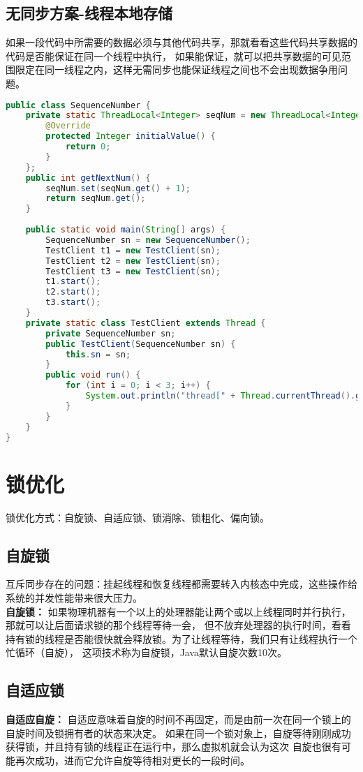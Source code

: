 \subsection{无同步方案-线程本地存储}
如果一段代码中所需要的数据必须与其他代码共享，那就看看这些代码共享数据的代码是否能保证在同一个线程中执行，
如果能保证，就可以把共享数据的可见范围限定在同一线程之内，这样无需同步也能保证线程之间也不会出现数据争用问题。
\begin{lstlisting}[language=java]
public class SequenceNumber {
	private static ThreadLocal<Integer> seqNum = new ThreadLocal<Integer>(){
		@Override
		protected Integer initialValue() {
			return 0;
		}
	};
	public int getNextNum() {
		seqNum.set(seqNum.get() + 1);
		return seqNum.get();
	}
	
	public static void main(String[] args) {
		SequenceNumber sn = new SequenceNumber();
		TestClient t1 = new TestClient(sn);
		TestClient t2 = new TestClient(sn);
		TestClient t3 = new TestClient(sn);
		t1.start();
		t2.start();
		t3.start();
	}
	private static class TestClient extends Thread {
		private SequenceNumber sn;
		public TestClient(SequenceNumber sn) {
			this.sn = sn;
		}
		public void run() {
			for (int i = 0; i < 3; i++) {
				System.out.println("thread[" + Thread.currentThread().getName() + "]sn[" + sn.getNextNum() + "]");
			}
		}
	}
}
\end{lstlisting}
\section{锁优化}
锁优化方式：自旋锁、自适应锁、锁消除、锁粗化、偏向锁。
\subsection{自旋锁}
\noindent 互斥同步存在的问题：挂起线程和恢复线程都需要转入内核态中完成，这些操作给系统的并发性能带来很大压力。
\\ \textbf{自旋锁：}
如果物理机器有一个以上的处理器能让两个或以上线程同时并行执行，那就可以让后面请求锁的那个线程等待一会，
但不放弃处理器的执行时间，看看持有锁的线程是否能很快就会释放锁。为了让线程等待，我们只有让线程执行一个忙循环（自旋），
这项技术称为自旋锁，Java默认自旋次数10次。
\subsection{自适应锁}
\noindent \textbf{自适应自旋：}
自适应意味着自旋的时间不再固定，而是由前一次在同一个锁上的自旋时间及锁拥有者的状态来决定。
如果在同一个锁对象上，自旋等待刚刚成功获得锁，并且持有锁的线程正在运行中，那么虚拟机就会认为这次
自旋也很有可能再次成功，进而它允许自旋等待相对更长的一段时间。

